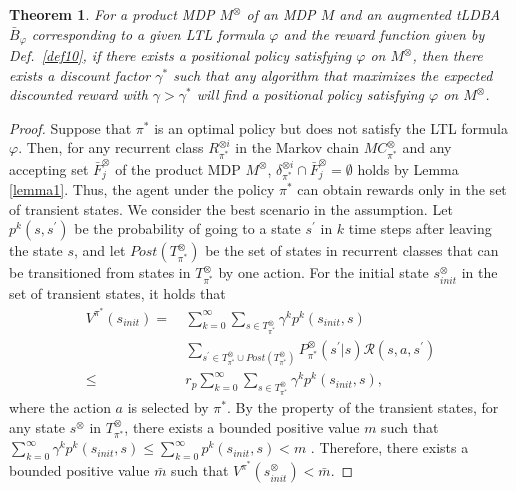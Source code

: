 \documentclass[letterpaper, 10 pt, conference]{ieeeconf}  %
\newtheorem{theorem}{Theorem}
\begin{document}
\begin{theorem}
  For a product MDP $M^{\otimes}$ of an MDP $M$ and an augmented tLDBA $\bar{B}_{\varphi}$ corresponding to a given LTL formula $\varphi$ and the reward function given by Def.\ \ref{def10}, if there exists a positional policy satisfying $\varphi$ on $M^{\otimes}$, then there exists a discount factor $\gamma^{\ast}$ such that any algorithm that maximizes the expected discounted reward with $\gamma > \gamma^{\ast}$ will find a positional policy satisfying $\varphi$ on $M^{\otimes}$.
  \label{theorem1}
\end{theorem}

\begin{proof}
  Suppose that $\pi^{\ast}$ is an optimal policy but does not satisfy the LTL formula $\varphi$. Then, for any recurrent class $R^{\otimes i}_{{\pi}^{\ast}}$ in the Markov chain $MC^{\otimes}_{{\pi}^{\ast}}$ and any accepting set $\bar{F}^{\otimes}_j$ of the product MDP $M^{\otimes}$,  $\delta^{\otimes i}_{\pi^{\ast}} \cap \bar{F}^{\otimes}_j = \emptyset$
  holds by Lemma \ref{lemma1}. Thus, the agent under the policy $\pi^{\ast}$ can obtain rewards only in the set of transient states. We consider the best scenario in the assumption. Let $p^k(s,s^{\prime})$ be the probability of going to a state $s^{\prime}$ in $k$ time steps after leaving the state $s$, and let $Post(T^{\otimes}_{\pi^{\ast}})$ be the set of states in recurrent classes that can be transitioned from states in $T^{\otimes}_{\pi^{\ast}}$ by one action. For the initial state $s^{\otimes}_{init}$ in the set of transient states, it holds that
  \begin{align}
    V^{\pi^{\ast}}\!(s_{init})
     =\ & \sum_{k=0}^{\infty} \sum_{s \in T^{\otimes}_{\pi^{\ast}}} \gamma^k p^k(s_{init}, s) \nonumber \\
      & \sum_{s^{\prime} \in T^{\otimes}_{\pi^{\ast}} \cup Post(T^{\otimes}_{\pi^{\ast}})} \!\!\!\!P^{\otimes}_{\pi^{\ast}}(s^{\prime}| s) \mathcal{R}(s, a, s^{\prime})\nonumber \\
     \leq\ & r_p \sum_{k=0}^{\infty} \sum_{s \in T^{\otimes}_{\pi^{\ast}}} \gamma^k p^k(s_{init}, s), \nonumber
  \label{eqth11}
  \end{align}
  where the action $a$ is selected by $\pi^{\ast}$. By the property of the transient states, for any state $s^{\otimes}$ in $T^{\otimes}_{\pi^{\ast}}$, there exists a bounded positive value $m$ such that $ \sum_{k=0}^{\infty} \gamma^k p^k(s_{init}, s) \leq \sum_{k=0}^{\infty} p^k(s_{init}, s) < m$ \cite{ESS}. Therefore, there exists a bounded positive value $\bar{m}$ such that $V^{\pi^{\ast}}(s^{\otimes}_{init}) < \bar{m}$.

\end{proof}
\end{document}
